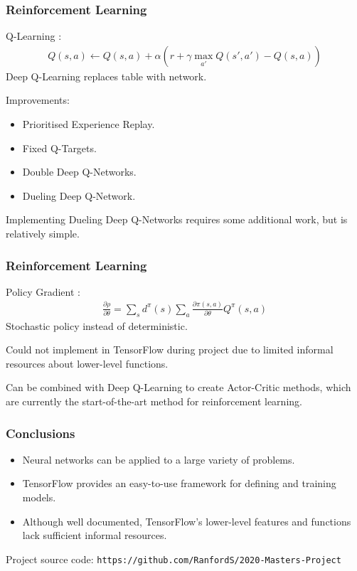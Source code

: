 \documentclass{beamer}
\newlength{\rs}
\begin{document}
\begin{frame}
    \frametitle{Reinforcement Learning}

    Q-Learning \citep{Watkins:1989:Learning}:
    \begin{align*}
        Q(s,a) \leftarrow Q(s,a) + \alpha(r + \gamma\max_{a'} Q(s',a') - Q(s,a))
    \end{align*}
    Deep Q-Learning replaces table with network.

    Improvements:
    \begin{itemize}
        \item Prioritised Experience Replay.
        \item Fixed Q-Targets.
        \item Double Deep Q-Networks.
        \item Dueling Deep Q-Network.
    \end{itemize}
    Implementing Dueling Deep Q-Networks requires some additional work, but is
    relatively simple.
\end{frame}

\begin{frame}
    \frametitle{Reinforcement Learning}

    Policy Gradient \citep{Sutton:2000:Policy}:
    \begin{align*}
        \frac{\partial\rho}{\partial\theta} = \sum_s d^\pi(s)
        \sum_a \frac{\partial\pi(s,a)}{\partial\theta}Q^\pi(s,a)
    \end{align*}
    Stochastic policy instead of deterministic.

    Could not implement in TensorFlow during project due to limited informal
    resources about lower-level functions.

    Can be combined with Deep Q-Learning to create Actor-Critic methods, which
    are currently the start-of-the-art method for reinforcement learning.
\end{frame}

\begin{frame}
    \frametitle{Conclusions}

    \begin{itemize}
        \item Neural networks can be applied to a large variety of problems.
        \item TensorFlow provides an easy-to-use framework for defining and
            training models.
        \item Although well documented, TensorFlow's lower-level features and
            functions lack sufficient informal resources.
    \end{itemize}

    Project source code: \texttt{https://github.com/RanfordS/2020-Masters-Project}
\end{frame}
\end{document}
